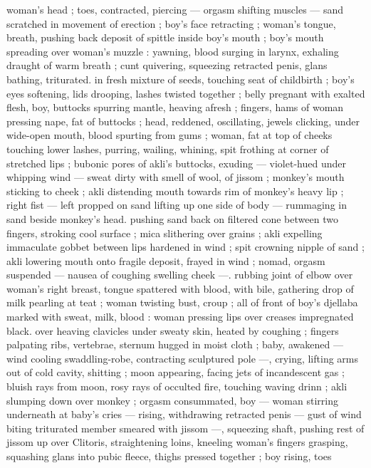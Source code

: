 woman's head ; toes, contracted, piercing --- orgasm shifting 
muscles --- sand scratched in movement of erection ; boy's face 
retracting ; woman's tongue, breath, pushing back deposit of spittle 
inside boy's mouth ; boy's mouth spreading over woman's muzzle : 
yawning, blood surging in larynx, exhaling draught of warm breath ; 
cunt quivering, squeezing retracted penis, glans bathing, triturated. 
in fresh mixture of seeds, touching seat of childbirth ; boy's eyes 
softening, lids drooping, lashes twisted together ; belly pregnant with 
exalted flesh, boy, buttocks spurring mantle, heaving afresh ; fingers, 
hams of woman pressing nape, fat of buttocks ; head, reddened, 
oscillating, jewels clicking, under wide-open mouth, blood spurting 
from gums ; woman, fat at top of cheeks touching lower lashes, 
purring, wailing, whining, spit frothing at corner of stretched lips ; 
bubonic pores of akli's buttocks, exuding --- violet-hued under 
whipping wind --- sweat dirty with smell of wool, of jissom ; 
monkey's mouth sticking to cheek ; akli distending mouth towards 
rim of monkey's heavy lip ; right fist --- left propped on sand lifting 
up one side of body --- rummaging in sand beside monkey's head. 
pushing sand back on filtered cone between two fingers, stroking 
cool surface ; mica slithering over grains ; akli expelling immaculate 
gobbet between lips hardened in wind ; spit crowning nipple of sand 
; akli lowering mouth onto fragile deposit, frayed in wind ; nomad, 
orgasm suspended --- nausea of coughing swelling cheek ---. 
rubbing joint of elbow over woman's right breast, tongue spattered 
with blood, with bile, gathering drop of milk pearling at teat ; woman 
twisting bust, croup ; all of front of boy's djellaba marked with sweat, 
milk, blood : woman pressing lips over creases impregnated black. 
over heaving clavicles under sweaty skin, heated by coughing ; 
fingers palpating ribs, vertebrae, sternum hugged in moist cloth ; 
baby, awakened --- wind cooling swaddling-robe, contracting 
sculptured pole ---, crying, lifting arms out of cold cavity, shitting ; 
moon appearing, facing jets of incandescent gas ; bluish rays from 
moon, rosy rays of occulted fire, touching waving drinn ; akli 
slumping down over monkey ; orgasm consummated, boy --- woman 
stirring underneath at baby's cries --- rising, withdrawing retracted 
penis --- gust of wind biting triturated member smeared with jissom 
---, squeezing shaft, pushing rest of jissom up over Clitoris, 
straightening loins, kneeling woman's fingers grasping, squashing 
glans into pubic fleece, thighs pressed together ; boy rising, toes 
